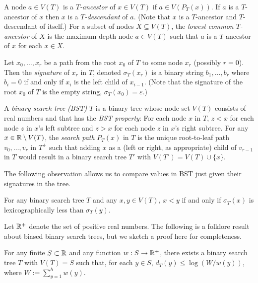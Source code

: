 \documentclass[kpfonts]{patmorin}
\let\le\leqslant
\begin{document}
A node $a\in V(T)$ is a \emph{$T$-ancestor} of $x\in V(T)$ if $a\in V(P_T(x))$. If $a$ is a $T$-ancestor of $x$ then $x$ is a \emph{$T$-descendant} of $a$. (Note that $x$ is a $T$-ancestor and $T$-descendant of itself.)  For a subset of nodes $X\subseteq V(T)$, the \emph{lowest common $T$-ancestor} of $X$ is the maximum-depth node $a\in V(T)$ such that $a$ is a $T$-ancestor of $x$ for each $x\in X$.  

Let $x_0,\ldots,x_{r}$ be a path from the root $x_0$ of $T$ to some node $x_r$ (possibly $r=0$).  Then the \emph{signature} of $x_r$ in $T$, denoted $\sigma_T(x_r)$ is a binary string $b_1,\ldots,b_r$ where $b_i=0$ if and only if $x_{i}$ is the left child of $x_{i-1}$.  (Note that the signature of the root $x_0$ of $T$ is the empty string,  $\sigma_T(x_0)=\varepsilon$.)

A \emph{binary search tree (BST)} $T$ is a binary tree whose node set $V(T)$ consists of real numbers and that has the \emph{BST property}:  For each node $x$ in $T$, $z<x$ for each node $z$ in $x$'s left subtree and $z>x$ for each node $z$ in $x$'s right subtree. For any $x\in\mathbb{R}\setminus V(T)$, the \emph{search path} $P_T(x)$ in $T$ is the unique root-to-leaf path $v_0,\ldots,v_r$ in $T^+$ such that adding $x$ as a (left or right, as appropriate) child of $v_{r-1}$ in $T$ would result in a binary search tree $T'$ with $V(T')=V(T)\cup\{x\}$.

The following observation allows us to compare values in BST just given their signatures in the tree.

\begin{obs}
  For any binary search tree $T$ and any $x,y\in V(T)$, $x<y$ if and only if $\sigma_T(x)$ is lexicographically less than $\sigma_T(y)$.
\end{obs}

Let $\mathbb{R}^+$ denote the set of positive real numbers. The following is a folklore result about biased binary search trees, but we sketch a proof here for completeness.

\begin{lem}
  For any finite $S\subset \mathbb{R}$ and any function $w:S\to\mathbb{R}^+$, there exists a binary search tree $T$ with $V(T)=S$ such that, for each $y\in S$, $d_T(y)\le\log(W/w(y))$, where $W:=\sum_{y=1}^h w(y)$.
\end{lem}
\end{document}
